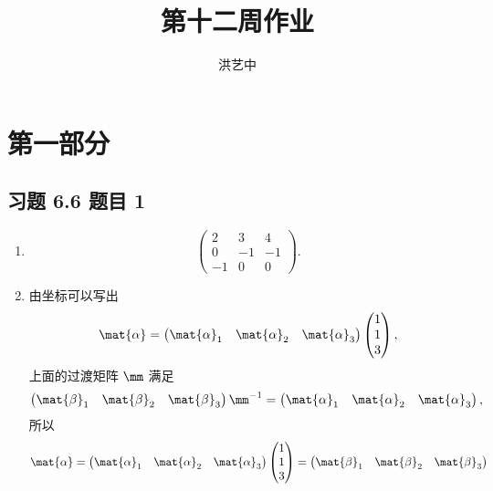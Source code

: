 \title{第十二周作业}
\author{洪艺中}
\maketitle
\section{第一部分}
\newcommand{\lvec}[1]{\overrightarrow{#1}}

\subsection*{ 习题 6.6 题目 1 }
\begin{solution}
\begin{enumerate}
    \item \[
        \left(\begin{matrix}
            2 & 3 & 4 \\
            0 & -1 & -1 \\
            -1 & 0 & 0
            \end{matrix}\right).
    \]
    \item 由坐标可以写出
    \[
    \mat{\alpha} = \begin{pmatrix}
        \mat{\alpha}_1 & \mat{\alpha}_2 & \mat{\alpha}_3
    \end{pmatrix}
    \begin{pmatrix}
        1 \\ 1 \\ 3
    \end{pmatrix},
    \]
    上面的过渡矩阵 $\mm$ 满足
    \[
        \begin{pmatrix}
            \mat{\beta}_1 & \mat{\beta}_2 & \mat{\beta}_3
        \end{pmatrix}\mm^{-1}
         = 
        \begin{pmatrix}
            \mat{\alpha}_1 & \mat{\alpha}_2 & \mat{\alpha}_3
        \end{pmatrix},
    \]
    所以
    \[
        \mat{\alpha} = \begin{pmatrix}
            \mat{\alpha}_1 & \mat{\alpha}_2 & \mat{\alpha}_3
        \end{pmatrix}
        \begin{pmatrix}
            1 \\ 1 \\ 3
        \end{pmatrix}
        =
        \begin{pmatrix}
            \mat{\beta}_1 & \mat{\beta}_2 & \mat{\beta}_3

\end{pmatrix}\]
\end{enumerate}
\end{solution}
